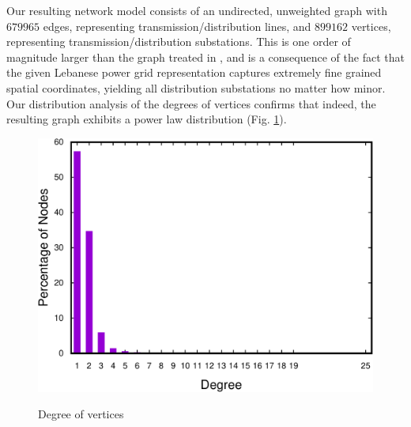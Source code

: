 Our resulting network model consists of an undirected, unweighted graph with $679965$ edges, representing transmission/distribution lines, and $899162$ vertices, representing transmission/distribution substations. This is one order of magnitude larger than the graph treated in \cite{2000Natur.406..378A}, and is a consequence of the fact that the given Lebanese power grid representation captures extremely fine grained spatial coordinates, yielding all distribution substations no matter how minor. Our distribution analysis of the degrees of vertices confirms that indeed, the resulting graph exhibits a power law distribution (Fig. \ref{fig:degree-vertices}). 

\begin{figure}[!tbp]
  \centering
     {\includegraphics[scale=0.35]{bench/generated/degree-counter-crop.pdf}}
  \caption{Degree of vertices}
    \label{fig:degree-vertices}
\end{figure}

